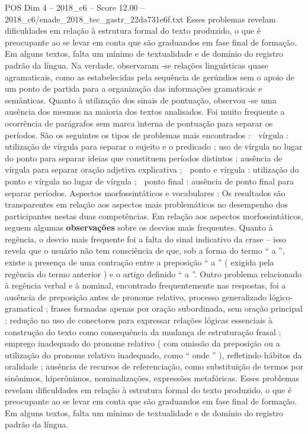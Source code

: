 \begin{textsample}{POS Dim 4 – 2018\_c6 – Score 12.00 – 2018\_c6/enade\_2018\_tec\_gastr\_22da731e6f.txt}
Esses problemas revelam dificuldades em relação à estrutura formal do texto produzido, o que é preocupante ao se levar em conta que são graduandos em fase final de formação.
Em alguns textos, falta um mínimo de textualidade e de domínio do registro padrão da língua.
Na verdade, observaram -se relações linguísticas quase agramaticais, como as estabelecidas pela sequência de gerúndios sem o apoio de um ponto de partida para a organização das informações gramaticais e semânticas.
Quanto à utilização dos sinais de pontuação, observou -se uma ausência dos mesmos na maioria dos textos analisados.
Foi muito frequente a ocorrência de parágrafos sem marca interna de pontuação para separar os períodos.
São os seguintes os tipos de problemas mais encontrados :  vírgula : utilização de vírgula para separar o sujeito e o predicado ; uso de vírgula no lugar do ponto para separar ideias que constituem períodos distintos ; ausência de vírgula para separar oração adjetiva explicativa ;  ponto e vírgula : utilização do ponto e vírgula no lugar de vírgula ;  ponto final : ausência de ponto final para separar períodos.
Aspectos morfossintáticos e vocabulares : Os resultados são transparentes em relação aos aspectos mais problemáticos no desempenho dos participantes nestas duas competências.
Em relação aos aspectos morfossintáticos, seguem algumas \textbf{observações} sobre os desvios mais frequentes.
Quanto à regência, o desvio mais frequente foi a falta do sinal indicativo da crase – isso revela que o usuário não tem consciência de que, sob a forma do termo “ a ”, existe a presença de uma contração entre a preposição “ a ” ( exigida pela regência do termo anterior ) e o artigo definido “ a ”.
Outro problema relacionado à regência verbal e à nominal, encontrado frequentemente nas respostas, foi a ausência de preposição antes de pronome relativo, processo generalizado lógico-gramatical ; frases formadas apenas por oração subordinada, sem oração principal ; redução no uso de conectores para expressar relações lógicas essenciais à construção do texto como consequência da mudança de estruturação frasal ; emprego inadequado do pronome relativo ( com omissão da preposição ou a utilização do pronome relativo inadequado, como “ onde ” ), refletindo hábitos da oralidade ; ausência de recursos de referenciação, como substituição de termos por sinônimos, hiperônimos, nominalizações, expressões metafóricas.
Esses problemas revelam dificuldades em relação à estrutura formal do texto produzido, o que é preocupante ao se levar em conta que são graduandos em fase final de formação.
Em alguns textos, falta um mínimo de textualidade e de domínio do registro padrão da língua.

\end{textsample}
